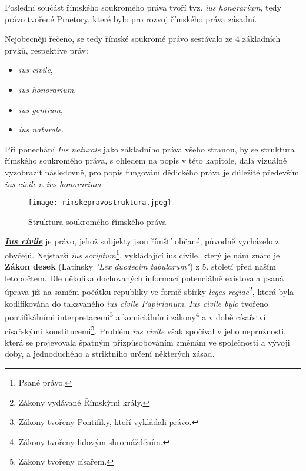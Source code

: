 \documentclass{article}
\begin{document}
Poslední součást římského soukromého práva tvoří tvz. \textit{ius honorarium}, tedy právo tvořené Praetory, které bylo pro rozvoj římského práva zásadní. \\

\newpage

Nejobecněji řečeno, se tedy římské soukromé právo sestávalo ze 4 základních prvků, respektive práv:
\vspace{5 mm}

\begin{itemize}
\item \textit{ius civile},
\item \textit{ius honorarium},
\item \textit{ius gentium},
\item \textit{ius naturale}.
\end{itemize}

\vspace{5 mm}


Při ponechání \textit{Ius naturale} jako základního práva všeho stranou, by se struktura římského soukromého práva, s ohledem na popis v této kapitole, dala vizuálně vyzobrazit následovně, pro popis fungování dědického práva je důležité především \textit{ius civile} a \textit{ius honorarium}:

\begin{figure}[h]
\centering
\texttt{[image: rimskepravostruktura.jpeg]}
\caption{Struktura soukromého římského práva}
\label{fig:struktura}
\end{figure}

\underline{\textbf{\textit{Ius civile}}} je právo, jehož subjekty jsou římští občané, původně vycházelo z obyčejů. Nejstarší \textit{ius scriptum}\footnote{Psané právo.}, vykládající ius civile, který je nám znám je \textbf{Zákon \MakeUppercase{} desek} (Latinsky \textit{"Lex duodecim tabularum"}) z 5. století před naším letopočtem. Dle několika dochovaných informací potenciálně existovala psaná úprava již na samém počátku republiky ve formě sbírky \textit{leges regiae}\footnote{Zákony vydávané Římskými krály.}, která byla kodifikována do takzvaného \textit{ius civile Papirianum}. \textit{Ius civile bylo} tvořeno pontifikálními interpretacemi\footnote{Zákony tvořeny Pontifiky, kteří vykládali právo.} a komiciálními zákony\footnote{Zákony tvořeny lidovým shromážděním.} a v době císařství císařskými konstitucemi\footnote{Zákony tvořeny císařem.}. Problém \textit{ius civile} však spočíval v jeho nepružnosti, která se projevovala špatným přizpůsobováním změnám ve společnosti a vývoji doby, a jednoduchého a striktního určení některých zásad. \\
\end{document}
